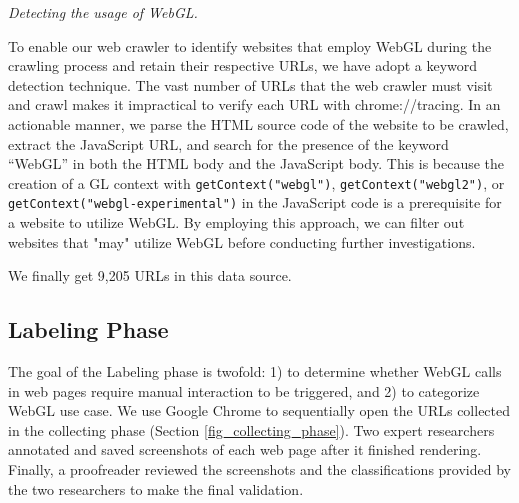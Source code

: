 \textit{Detecting the usage of WebGL.}

To enable our web crawler to identify websites that employ WebGL during the crawling process and retain their respective URLs, we have adopt a keyword detection technique. The vast number of URLs that the web crawler must visit and crawl makes it impractical to verify each URL with chrome://tracing. In an actionable manner, we parse the HTML source code of the website to be crawled, extract the JavaScript URL, and search for the presence of the keyword ``WebGL'' in both the HTML body and the JavaScript body. This is because the creation of a GL context with \texttt{getContext("webgl")}, \texttt{getContext("webgl2")}, or \texttt{getContext("webgl-experimental")} in the JavaScript code is a prerequisite for a website to utilize WebGL. By employing this approach, we can filter out websites that "may" utilize WebGL before conducting further investigations.

We finally get 9,205 URLs in this data source.

\subsection{Labeling Phase}

The goal of the Labeling phase is twofold: 1) to determine whether WebGL calls in web pages require manual interaction to be triggered, and 2) to categorize WebGL use case. We use Google Chrome to sequentially open the  URLs collected in the collecting phase (Section \ref{fig_collecting_phase}). Two expert researchers annotated and saved screenshots of each web page after it finished rendering. Finally, a proofreader reviewed the screenshots and the classifications provided by the two researchers to make the final validation.




